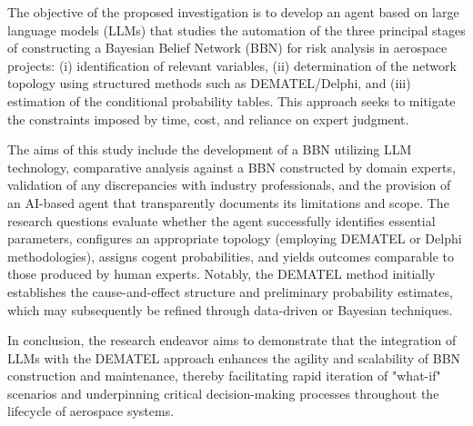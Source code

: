 The objective of the proposed investigation is to develop an agent based on large language models (LLMs) that studies the automation of the three principal stages of constructing a Bayesian Belief Network (BBN) for risk analysis in aerospace projects: (i) identification of relevant variables, (ii) determination of the network topology using structured methods such as DEMATEL/Delphi, and (iii) estimation of the conditional probability tables. This approach seeks to mitigate the constraints imposed by time, cost, and reliance on expert judgment.

The aims of this study include the development of a BBN utilizing LLM technology, comparative analysis against a BBN constructed by domain experts, validation of any discrepancies with industry professionals, and the provision of an AI-based agent that transparently documents its limitations and scope. The research questions evaluate whether the agent successfully identifies essential parameters, configures an appropriate topology (employing DEMATEL or Delphi methodologies), assigns cogent probabilities, and yields outcomes comparable to those produced by human experts. Notably, the DEMATEL method initially establishes the cause-and-effect structure and preliminary probability estimates, which may subsequently be refined through data-driven or Bayesian techniques.

In conclusion, the research endeavor aims to demonstrate that the integration of LLMs with the DEMATEL approach enhances the agility and scalability of BBN construction and maintenance, thereby facilitating rapid iteration of "what-if" scenarios and underpinning critical decision-making processes throughout the lifecycle of aerospace systems.